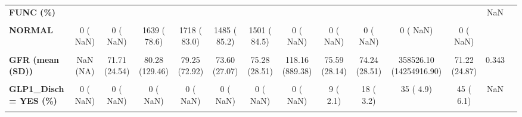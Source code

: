 \documentclass[
]{article}
\begin{document}
\begin{table}[H]
\begin{tabular}[t]{>{\raggedright\arraybackslash}p{5em}ccccccccccccc}
\textbf{FUNC (\%)} &  &  &  &  &  &  &  &  &  &  &  & NaN & \\
\textbf{\cellcolor{gray!10}{MILDLY IMPAIRED}} & \cellcolor{gray!10}{0 (  NaN)} & \cellcolor{gray!10}{0 (  NaN)} & \cellcolor{gray!10}{367 ( 17.6)} & \cellcolor{gray!10}{253 ( 12.2)} & \cellcolor{gray!10}{204 ( 11.7)} & \cellcolor{gray!10}{213 ( 12.0)} & \cellcolor{gray!10}{0 (  NaN)} & \cellcolor{gray!10}{0 (  NaN)} & \cellcolor{gray!10}{0 (  NaN)} & \cellcolor{gray!10}{0 (  NaN)} & \cellcolor{gray!10}{0 (  NaN)} & \cellcolor{gray!10}{} & \cellcolor{gray!10}{}\\
\textbf{NORMAL} & 0 (  NaN) & 0 (  NaN) & 1639 ( 78.6) & 1718 ( 83.0) & 1485 ( 85.2) & 1501 ( 84.5) & 0 (  NaN) & 0 (  NaN) & 0 (  NaN) & 0 (  NaN) & 0 (  NaN) &  & \\
\textbf{\cellcolor{gray!10}{SIGNIFICANTLY IMPAIRED}} & \cellcolor{gray!10}{0 (  NaN)} & \cellcolor{gray!10}{0 (  NaN)} & \cellcolor{gray!10}{79 (  3.8)} & \cellcolor{gray!10}{99 (  4.8)} & \cellcolor{gray!10}{54 (  3.1)} & \cellcolor{gray!10}{63 (  3.5)} & \cellcolor{gray!10}{0 (  NaN)} & \cellcolor{gray!10}{0 (  NaN)} & \cellcolor{gray!10}{0 (  NaN)} & \cellcolor{gray!10}{0 (  NaN)} & \cellcolor{gray!10}{0 (  NaN)} & \cellcolor{gray!10}{} & \cellcolor{gray!10}{}\\
\textbf{GFR (mean (SD))} & NaN (NA) & 71.71 (24.54) & 80.28 (129.46) & 79.25 (72.92) & 73.60 (27.07) & 75.28 (28.51) & 118.16 (889.38) & 75.59 (28.14) & 74.24 (28.51) & 358526.10 (14254916.90) & 71.22 (24.87) & 0.343 & \\
\textbf{\cellcolor{gray!10}{GLP1\_Chron = YES (\%)}} & \cellcolor{gray!10}{0 (  NaN)} & \cellcolor{gray!10}{0 (  NaN)} & \cellcolor{gray!10}{0 (  NaN)} & \cellcolor{gray!10}{0 (  NaN)} & \cellcolor{gray!10}{0 (  NaN)} & \cellcolor{gray!10}{0 (  NaN)} & \cellcolor{gray!10}{0 (  NaN)} & \cellcolor{gray!10}{16 (  2.6)} & \cellcolor{gray!10}{22 (  4.1)} & \cellcolor{gray!10}{26 (100.0)} & \cellcolor{gray!10}{44 (  5.9)} & \cellcolor{gray!10}{NaN} & \cellcolor{gray!10}{}\\
\textbf{GLP1\_Disch = YES (\%)} & 0 (  NaN) & 0 (  NaN) & 0 (  NaN) & 0 (  NaN) & 0 (  NaN) & 0 (  NaN) & 0 (  NaN) & 9 (  2.1) & 18 (  3.2) & 35 (  4.9) & 45 (  6.1) & NaN & \\
\textbf{\cellcolor{gray!10}{GLP1\_Hosp = YES (\%)}} & \cellcolor{gray!10}{0 (  NaN)} & \cellcolor{gray!10}{0 (  NaN)} & \cellcolor{gray!10}{0 (  NaN)} & \cellcolor{gray!10}{0 (  NaN)} & \cellcolor{gray!10}{0 (  NaN)} & \cellcolor{gray!10}{0 (  NaN)} & \cellcolor{gray!10}{0 (  NaN)} & \cellcolor{gray!10}{6 (  1.5)} & \cellcolor{gray!10}{18 (  3.2)} & \cellcolor{gray!10}{19 (  2.6)} & \cellcolor{gray!10}{10 (  1.3)} & \cellcolor{gray!10}{NaN} & \cellcolor{gray!10}{}\\

\end{tabular}
\end{table}
\end{document}
